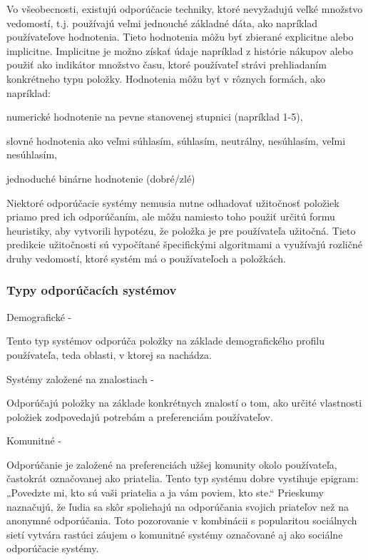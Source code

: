 Vo všeobecnosti, existujú odporúčacie techniky, ktoré nevyžadujú veľké množstvo vedomostí, t.j. používajú veľmi jednouché základné dáta, ako napríklad používateľove hodnotenia. Tieto hodnotenia môžu byť zbierané explicitne alebo implicitne. Implicitne je možno získať údaje napríklad z histórie nákupov alebo použiť ako indikátor množstvo času, ktoré používateľ strávi prehliadaním konkrétneho typu položky. Hodnotenia môžu byť v rôznych formách, ako napríklad: \cite{rs1}
 \begin{itemize}[leftmargin=*]
{\item numerické hodnotenie na pevne stanovenej stupnici (napríklad 1-5),} 
{\item slovné hodnotenia ako veľmi súhlasím, súhlasím, neutrálny, nesúhlasím, veľmi nesúhlasím,} 
{\item jednoduché binárne hodnotenie (dobré/zlé)} \cite{rs1}
\end{itemize} 

Niektoré odporúčacie systémy nemusia nutne odhadovať užitočnosť položiek priamo pred ich odporúčaním, ale môžu namiesto toho použiť určitú formu heuristiky, aby vytvorili hypotézu, že položka je pre používateľa užitočná. Tieto predikcie užitočnosti sú vypočítané špecifickými algoritmami a využívajú rozličné druhy vedomostí, ktoré systém má o používateľoch a položkách. \cite{rs1} \\

\subsubsection{Typy odporúčacích systémov}
\begin{itemize}[leftmargin=*]
{\bf \item Demografické - }Tento typ systémov odporúča položky na základe demografického
profilu používateľa, teda oblasti, v ktorej sa nachádza. 
{\bf \item Systémy založené na znalostiach - }Odporúčajú položky na základe konkrétnych znalostí o tom, ako určité vlastnosti položiek zodpovedajú potrebám a preferenciám používateľov.
{\bf \item Komunitné - }Odporúčanie je založené na preferenciách užšej komunity okolo používateľa, častokrát označovanej ako priatelia. Tento typ systému dobre vystihuje epigram: „Povedzte mi, kto sú vaši priatelia a ja vám poviem, kto ste.“ Prieskumy naznačujú, že ľudia sa skôr spoliehajú na odporúčania svojich priateľov než na anonymné odporúčania. \cite{communityrec} Toto pozorovanie v kombinácii s popularitou sociálnych sietí vytvára rastúci záujem o komunitné systémy označované aj ako sociálne odporúčacie systémy. \cite{rs1}\\
\end{itemize} 
 
